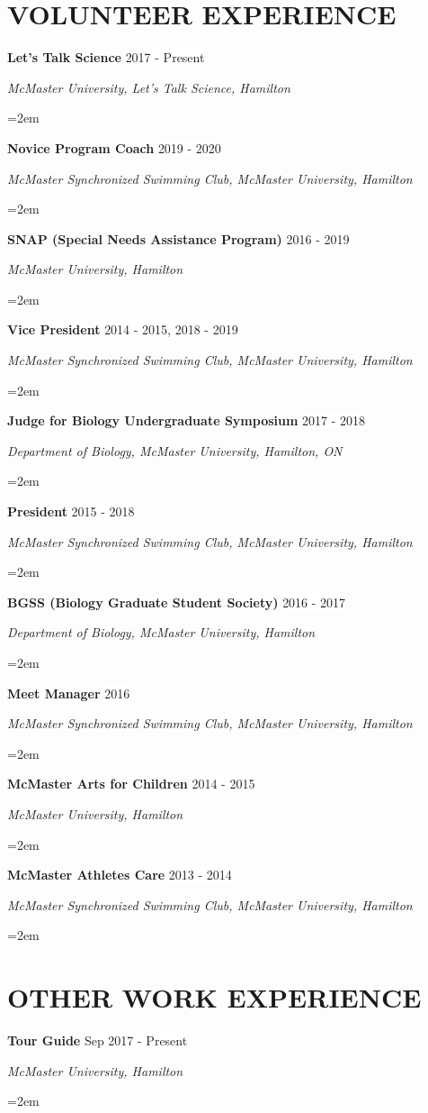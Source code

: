 \documentclass[paper=a4,fontsize=11pt]{scrartcl}	 			%
\newcommand{\NewPart}[1]{\section*{\uppercase{#1}}}
\newcommand{\EducationEntry}[4]{
		\noindent \textbf{#1} \hfill 					%
		\colorbox{White}{%
			\parbox{10em}{%
			\hfill\color{Black}#2}} \par				%
		\noindent \textit{#3} \par					%
		\noindent\hangindent=2em\hangafter=0 \small #4 	%
		\normalsize \par}
\newcommand{\WorkEntry}[4]{						%
		\noindent \textbf{#1} \hfill 					%
		\colorbox{White}{\color{Black}#2} \par		%
		\noindent \textit{#3} \par					%
		\noindent\hangindent=2em\hangafter=0 \small #4 	%
		\normalsize \par}
\begin{document}
\NewPart{Volunteer Experience}{}
\WorkEntry{Let's Talk Science}{2017 - Present}{McMaster University, Let's Talk Science, Hamilton}{}
\WorkEntry{Novice Program Coach}{2019 - 2020}{McMaster Synchronized Swimming Club, McMaster University, Hamilton}{}
\WorkEntry{SNAP (Special Needs Assistance Program)}{2016 - 2019}{McMaster University, Hamilton}{}
\WorkEntry{Vice President}{2014 - 2015, 2018 - 2019}{McMaster Synchronized Swimming Club, McMaster University, Hamilton}{}
\WorkEntry{Judge for Biology Undergraduate Symposium}{2017 - 2018}{Department of Biology, McMaster University, Hamilton, ON}{}
\WorkEntry{President}{2015 - 2018}{McMaster Synchronized Swimming Club, McMaster University, Hamilton}{}
\WorkEntry{BGSS (Biology Graduate Student Society)}{2016 - 2017}{Department of Biology, McMaster University, Hamilton}{}
\WorkEntry{Meet Manager}{2016}{McMaster Synchronized Swimming Club, McMaster University, Hamilton}{}
\WorkEntry{McMaster Arts for Children}{2014 - 2015}{McMaster University, Hamilton}{}
\WorkEntry{McMaster Athletes Care}{2013 - 2014}{McMaster Synchronized Swimming Club, McMaster University, Hamilton}{}

%
\NewPart{Other Work Experience}{}
\WorkEntry{Tour Guide}{Sep 2017 - Present}{McMaster University, Hamilton}{}
\end{document}
